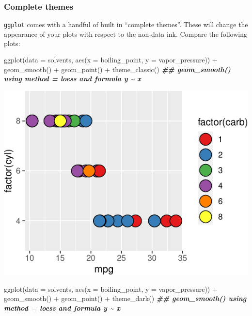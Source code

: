 \documentclass[
]{krantz}
\newenvironment{Shaded}{\begin{snugshade}}{\end{snugshade}}
\newcommand{\AttributeTok}[1]{\textcolor[rgb]{0.77,0.63,0.00}{#1}}
\newcommand{\DocumentationTok}[1]{\textcolor[rgb]{0.56,0.35,0.01}{\textbf{\textit{#1}}}}
\newcommand{\FunctionTok}[1]{\textcolor[rgb]{0.00,0.00,0.00}{#1}}
\newcommand{\NormalTok}[1]{#1}
\newcommand{\SpecialCharTok}[1]{\textcolor[rgb]{0.00,0.00,0.00}{#1}}
\begin{document}
\hypertarget{complete-themes}{%
\subsubsection{Complete themes}\label{complete-themes}}

\texttt{ggplot} comes with a handful of built in ``complete themes''. These will change the appearance of your plots with respect to the non-data ink. Compare the following plots:

\begin{Shaded}
\begin{Highlighting}[]
\FunctionTok{ggplot}\NormalTok{(}\AttributeTok{data =}\NormalTok{ solvents, }\FunctionTok{aes}\NormalTok{(}\AttributeTok{x =}\NormalTok{ boiling\_point, }\AttributeTok{y =}\NormalTok{ vapor\_pressure)) }\SpecialCharTok{+} 
  \FunctionTok{geom\_smooth}\NormalTok{() }\SpecialCharTok{+}
  \FunctionTok{geom\_point}\NormalTok{() }\SpecialCharTok{+}
  \FunctionTok{theme\_classic}\NormalTok{()}
\DocumentationTok{\#\# \textasciigrave{}geom\_smooth()\textasciigrave{} using method = \textquotesingle{}loess\textquotesingle{} and formula \textquotesingle{}y \textasciitilde{} x\textquotesingle{}}
\end{Highlighting}
\end{Shaded}

\begin{center}\includegraphics{index_files/figure-latex/unnamed-chunk-62-1} \end{center}

\begin{Shaded}
\begin{Highlighting}[]
\FunctionTok{ggplot}\NormalTok{(}\AttributeTok{data =}\NormalTok{ solvents, }\FunctionTok{aes}\NormalTok{(}\AttributeTok{x =}\NormalTok{ boiling\_point, }\AttributeTok{y =}\NormalTok{ vapor\_pressure)) }\SpecialCharTok{+} 
  \FunctionTok{geom\_smooth}\NormalTok{() }\SpecialCharTok{+}
  \FunctionTok{geom\_point}\NormalTok{() }\SpecialCharTok{+}
  \FunctionTok{theme\_dark}\NormalTok{()}
\DocumentationTok{\#\# \textasciigrave{}geom\_smooth()\textasciigrave{} using method = \textquotesingle{}loess\textquotesingle{} and formula \textquotesingle{}y \textasciitilde{} x\textquotesingle{}}
\end{Highlighting}
\end{Shaded}
\end{document}
